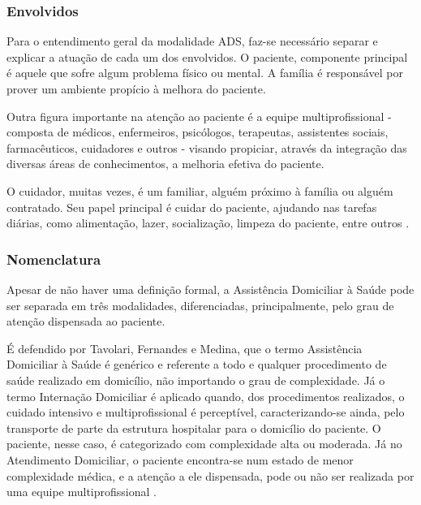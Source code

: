 \subsubsection{Envolvidos}\label{subsubsec:envolvidos}

Para o entendimento geral da modalidade ADS, faz-se necessário separar e
explicar a atuação de cada um dos envolvidos. O paciente, componente principal
é aquele que sofre algum problema físico ou mental. A família é responsável
por prover um ambiente propício à melhora do paciente.

Outra figura importante na atenção ao paciente é a equipe multiprofissional -
composta de médicos, enfermeiros, psicólogos, terapeutas, assistentes sociais,
farmacêuticos, cuidadores e outros - visando propiciar, através da integração
das diversas áreas de conhecimentos, a melhoria efetiva do paciente.

O cuidador, muitas vezes, é um familiar, alguém próximo à família ou alguém
contratado. Seu papel principal é cuidar do paciente, ajudando nas tarefas
diárias, como alimentação, lazer, socialização, limpeza do paciente, entre
outros \cite{amaral2001assistencia}.


\subsubsection{Nomenclatura}\label{subsubsec:nomenclatura}

Apesar de não haver uma definição formal, a Assistência Domiciliar à Saúde pode
ser separada em três modalidades, diferenciadas, principalmente, pelo grau de 
atenção dispensada ao paciente. 

É defendido por Tavolari, Fernandes e Medina, que o termo Assistência Domiciliar
à Saúde é genérico e referente a todo e qualquer procedimento de saúde realizado
em domicílio, não importando o grau de complexidade. Já o termo Internação
Domiciliar é aplicado quando, dos procedimentos realizados, o cuidado intensivo
e multiprofissional é perceptível, caracterizando-se ainda, pelo transporte de
parte da estrutura hospitalar para o domicílio do paciente. O paciente, nesse
caso, é categorizado com complexidade alta ou moderada.
Já no Atendimento Domiciliar, o paciente encontra-se num estado de menor 
complexidade médica, e a atenção a ele dispensada, pode ou não ser realizada por
uma equipe multiprofissional \cite{tavolari2000desenvolvimento}.

